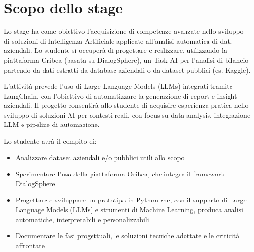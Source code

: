 \section*{Scopo dello stage}
Lo stage ha come obiettivo l'acquisizione di competenze avanzate nello sviluppo di soluzioni di Intelligenza Artificiale applicate all’analisi automatica di dati aziendali.
Lo studente si occuperà di progettare e realizzare, utilizzando la piattaforma Oribea (basata su DialogSphere), un Task AI per l’analisi di bilancio partendo da dati estratti da database aziendali o da dataset pubblici (es. Kaggle).

L’attività prevede l’uso di Large Language Models (LLMs) integrati tramite LangChain, con l’obiettivo di automatizzare la generazione di report e insight aziendali.
Il progetto consentirà allo studente di acquisire esperienza pratica nello sviluppo di soluzioni AI per contesti reali, con focus su data analysis, integrazione LLM e pipeline di automazione.

Lo studente avrà il compito di:
\begin{itemize}
 \item Analizzare dataset aziendali e/o pubblici utili allo scopo
 \item Sperimentare l’uso della piattaforma Oribea, che integra il framework DialogSphere
 \item Progettare e sviluppare un prototipo in Python che, con il supporto di Large Language Models (LLMs) e strumenti di Machine Learning, produca analisi automatiche, interpretabili e personalizzabili
 \item Documentare le fasi progettuali, le soluzioni tecniche adottate e le criticità affrontate
\end{itemize}